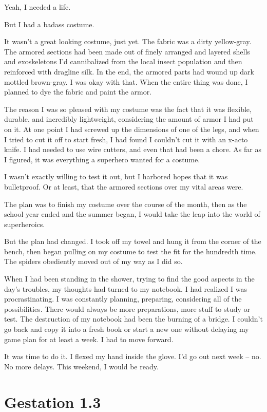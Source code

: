 Yeah, I needed a life.

But I had a badass costume.

It wasn't a great looking costume, just yet. The fabric was a dirty yellow-gray. The armored sections had been made out of finely arranged and layered shells and exoskeletons I'd cannibalized from the local insect population and then reinforced with dragline silk. In the end, the armored parts had wound up dark mottled brown-gray. I was okay with that. When the entire thing was done, I planned to dye the fabric and paint the armor.

The reason I was so pleased with my costume was the fact that it was flexible, durable, and incredibly lightweight, considering the amount of armor I had put on it. At one point I had screwed up the dimensions of one of the legs, and when I tried to cut it off to start fresh, I had found I couldn't cut it with an x-acto knife. I had needed to use wire cutters, and even that had been a chore. As far as I figured, it was everything a superhero wanted for a costume.

I wasn't exactly willing to test it out, but I harbored hopes that it was bulletproof. Or at least, that the armored sections over my vital areas were.

The plan was to finish my costume over the course of the month, then as the school year ended and the summer began, I would take the leap into the world of superheroics.

But the plan had changed. I took off my towel and hung it from the corner of the bench, then began pulling on my costume to test the fit for the hundredth time. The spiders obediently moved out of my way as I did so.

When I had been standing in the shower, trying to find the good aspects in the day's troubles, my thoughts had turned to my notebook. I had realized I was procrastinating. I was constantly planning, preparing, considering all of the possibilities. There would always be more preparations, more stuff to study or test. The destruction of my notebook had been the burning of a bridge. I couldn't go back and copy it into a fresh book or start a new one without delaying my game plan for at least a week. I had to move forward.

It was time to do it. I flexed my hand inside the glove. I'd go out next week -- no. No more delays. This weekend, I would be ready.


\chapter{Gestation 1.3}

